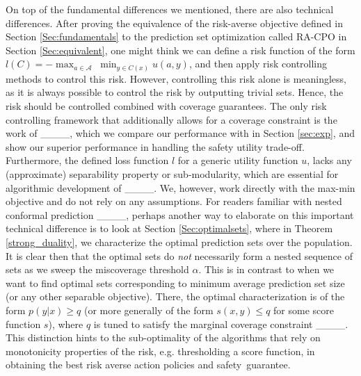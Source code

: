 On top of the fundamental differences we mentioned, there are also technical differences. After proving the equivalence of the risk-averse objective defined in Section \ref{Sec:fundamentals} to the prediction set optimization called RA-CPO in Section \ref{Sec:equivalent}, one might think we can define a risk function of the form $l(C) = - \max_{a \in \mathcal{A}}\; \min_{y \in C(x)} u(a, y)$, and then apply risk controlling methods to control this risk. However, controlling this risk alone is meaningless, as it is always possible to control the risk by outputting trivial sets. Hence, the risk should be controlled combined with coverage guarantees. The only risk controlling framework that additionally allows for a coverage constraint is the work of ____, which we compare our performance with  in  Section \ref{sec:exp}, and show our superior performance in handling the safety utility trade-off. Furthermore, the defined loss function $l$ for a generic utility function $u$, lacks any (approximate) separability property or sub-modularity, which are essential for algorithmic development of ____. We, however, work directly with the max-min objective and do not rely on any assumptions. For readers familiar with nested conformal prediction ____, perhaps another way to elaborate on this important technical difference is to look at Section \ref{Sec:optimalsets}, where in Theorem \ref{strong_duality}, we characterize the optimal prediction sets over the population. It is clear then that the optimal sets do \emph{not} necessarily form a nested sequence of sets as we sweep the miscoverage threshold $\alpha$. This is in contrast to when we want to find optimal sets corresponding to minimum average prediction set size (or any other separable objective). There, the optimal characterization is of the form $p(y|x) \geq q$ (or more generally of the form $s(x,y) \leq q$ for some score function $s$), where $q$ is tuned to satisfy the marginal coverage constraint ____. This distinction hints to the sub-optimality of the algorithms that  rely on monotonicity properties of the risk, e.g. thresholding a score function, in obtaining the best risk averse action policies and  safety~guarantee.

